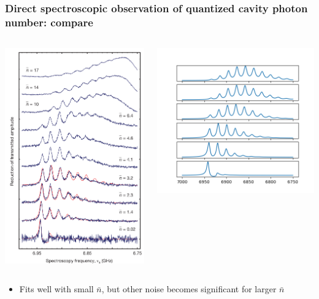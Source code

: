 \documentclass[xcolor=dvipsnames,hyperref={CJKbookmarks=true},aspectratio=169]{beamer}
\begin{document}
\begin{frame}[t]\frametitle{Direct spectroscopic observation of quantized cavity photon number: compare}
\begin{columns}
\begin{column}{0.35\linewidth}
    \centering
    \includegraphics[width=0.7\linewidth]{sweaping_origin.pdf}
\end{column}%
\begin{column}{0.65\linewidth}
	\centering
    \includegraphics[width=0.7\linewidth]{sweaping.png}
\end{column}
\end{columns}
\begin{itemize}
	\item Fits well with small $\bar n$, but other noise becomes significant 
	for larger $\bar n$
\end{itemize}
\end{frame}
\end{document}
